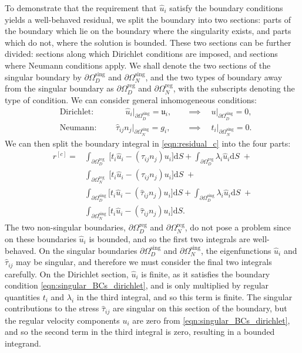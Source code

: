 \documentclass[12pt,a4paper]{article}
\numberwithin{equation}{section}
\newcommand{\D}{\mathrm{d}}
\begin{document}
To demonstrate that the requirement that $\hat u_i$ satisfy the boundary conditions yields a well-behaved residual, we split the boundary into two sections: parts of the boundary which lie on the boundary where the singularity exists, and parts which do not, where the solution is bounded. These two sections can be further divided: sections along which Dirichlet conditions are imposed, and sections where Neumann conditions apply. We shall denote the two sections of the singular boundary by $\partial\Omega_D^{\text{sing}}$ and $\partial\Omega_N^{\text{sing}}$, and the two types of boundary away from the singular boundary as $\partial\Omega_D^{\text{reg}}$ and $\partial\Omega_N^{\text{reg}}$, with the subscripts denoting the type of condition. We can consider general inhomogeneous conditions:
\begin{align}
  &\text{Dirichlet: }\quad\quad\quad\;\; \hat u_i\big|_{\partial\Omega_D^{\text{sing}}} = \mathfrak{u}_i, \quad&\implies\quad u\big|_{\partial\Omega_D^{\text{sing}}} = 0,
  \label{eqn:singular_BCs_dirichlet} \\
  &\text{Neumann: }\quad\quad \hat \tau_{ij}n_j\big|_{\partial\Omega_N^{\text{sing}}} = g_i, \quad&\implies\quad t_i\big|_{\partial\Omega_N^{\text{sing}}} = 0.
  \label{eqn:singular_BCs_neumann}
\end{align}
We can then split the boundary integral in \eqref{eqn:residual_c} into the four parts:
\begin{equation}
  \begin{split}
    r^{[c]} = &\int_{\partial\Omega_D^{\text{reg}}}\;\big[ t_i\hat u_i - (\hat \tau_{ij}n_j) u_i\big] \D S
    + \int_{\partial\Omega_D^{\text{reg}}}\lambda_i\hat u_i\D S\;+ \\
    &\int_{\partial\Omega_N^{\text{reg}}}\;\big[ t_i\hat u_i - (\hat \tau_{ij}n_j) u_i\big] \D S \; + \\
    &\int_{\partial\Omega_D^{\text{sing}}}\big[ t_i\hat u_i - (\hat \tau_{ij}n_j) u_i\big] \D S
    + \int_{\partial\Omega_D^{\text{sing}}}\lambda_i\hat u_i\D S\; + \\   
    &\int_{\partial\Omega_N^{\text{sing}}}\big[ t_i\hat u_i - (\hat \tau_{ij}n_j) u_i\big] \D S.
  \end{split}
\end{equation}
The two non-singular boundaries, $\partial\Omega_D^{\text{reg}}$ and $\partial\Omega_N^{\text{reg}}$, do not pose a problem since on these boundaries $\hat u_i$ is bounded, and so the first two integrals are well-behaved. On the singular boundaries $\partial\Omega_D^{\text{sing}}$ and $\partial\Omega_N^{\text{sing}}$, the eigenfunctions $\hat u_i$ and $\hat \tau_{ij}$ may be singular, and therefore we must consider the final two integrals carefully. On the Dirichlet section, $\hat u_i$ is finite, as it satisfies the boundary condition \eqref{eqn:singular_BCs_dirichlet}, and is only multiplied by regular quantities $t_i$ and $\lambda_i$ in the third integral, and so this term is finite. The singular contributions to the stress $\hat \tau_{ij}$ are singular on this section of the boundary, but the regular velocity components $u_i$ are zero from \eqref{eqn:singular_BCs_dirichlet}, and so the second term in the third integral is zero, resulting in a bounded integrand.
\end{document}
